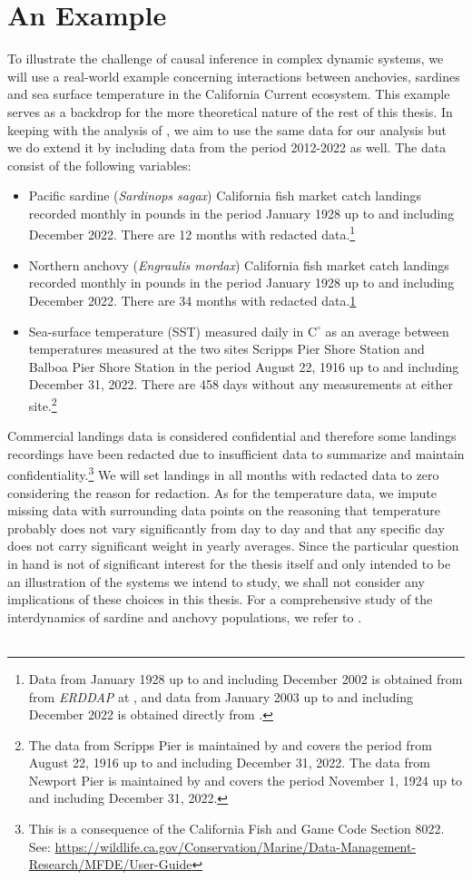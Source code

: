 \documentclass[11pt, a4paper]{memoir}
\theoremstyle{break}
\theoremstyle{break}
\theoremstyle{nonumberplain}
\begin{document}
\section{An Example}
To illustrate the challenge of causal inference in complex dynamic systems, we will use a real-world example concerning interactions between anchovies, sardines and sea surface temperature in the California Current ecosystem. This example serves as a backdrop for the more theoretical nature of the rest of this thesis. In keeping with the analysis of \cite{Sugihara}, we aim to use the same data for our analysis but we do extend it by including data from the period 2012-2022 as well. The data consist of the following variables:
\begin{itemize}
\item Pacific sardine (\textit{Sardinops sagax}) California fish market catch landings recorded monthly in pounds in the period January 1928 up to and including December 2022. There are 12 months with redacted data.\footnote{\label{note1}Data from January 1928 up to and including December 2002 is obtained from from \textit{ERDDAP} at \cite{oldData}, and data from January 2003 up to and including December 2022 is obtained directly from \cite{newData}.}
\item Northern anchovy (\textit{Engraulis mordax}) California fish market catch landings recorded monthly in pounds in the period January 1928 up to and including December 2022. There are 34 months with redacted data.\cref{note1} 
\item  Sea-surface temperature (SST) measured daily in $\text{C}^\circ$ as an average between temperatures measured at the two sites Scripps Pier Shore Station and Balboa Pier Shore Station in the period August 22, 1916 up to and including December 31, 2022. There are 458 days without any measurements at either site.\footnote{The data from Scripps Pier is maintained by \cite{Scripps} and covers the period from August 22, 1916 up to and including December 31, 2022. The data from Newport Pier is maintained by \cite{Newport} and covers the period November 1, 1924 up to and including December 31, 2022.} 
\end{itemize}
Commercial landings data is considered confidential and therefore some landings recordings have been redacted due to insufficient data to summarize and maintain confidentiality.\footnote{This is a consequence of the California Fish and Game Code Section 8022. See: \url{https://wildlife.ca.gov/Conservation/Marine/Data-Management-Research/MFDE/User-Guide}} We will set landings in all months with redacted data to zero considering the reason for redaction. As for the temperature data, we impute missing data with surrounding data points on the reasoning that temperature probably does not vary significantly from day to day and that any specific day does not carry significant weight in yearly averages. Since the particular question in hand is not of significant interest for the thesis itself and only intended to be an illustration of the systems we intend to study, we shall not consider any implications of these choices in this thesis. For a comprehensive study of the interdynamics of sardine and anchovy populations, we refer to \cite{Sardine}.\\\\
\end{document}
